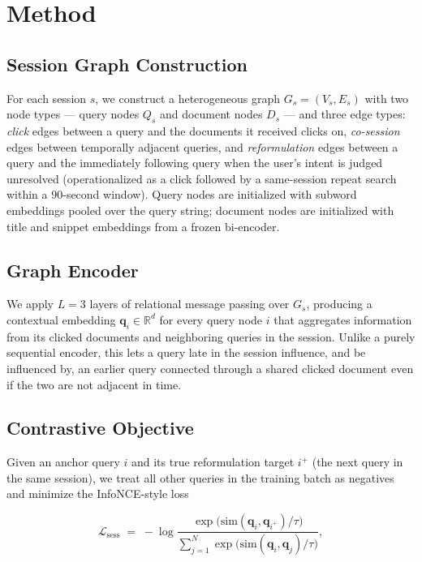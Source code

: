 \section{Method}
\label{sec:method}

\subsection{Session Graph Construction}

For each session $s$, we construct a heterogeneous graph $G_s = (V_s, E_s)$ with two
node types --- query nodes $Q_s$ and document nodes $D_s$ --- and three edge types:
\emph{click} edges between a query and the documents it received clicks on,
\emph{co-session} edges between temporally adjacent queries, and \emph{reformulation}
edges between a query and the immediately following query when the user's intent is
judged unresolved (operationalized as a click followed by a same-session repeat
search within a 90-second window). Query nodes are initialized with subword
embeddings pooled over the query string; document nodes are initialized with title
and snippet embeddings from a frozen bi-encoder.

\subsection{Graph Encoder}

We apply $L{=}3$ layers of relational message passing over $G_s$, producing a
contextual embedding $\mathbf{q}_i \in \mathbb{R}^d$ for every query node $i$ that
aggregates information from its clicked documents and neighboring queries in the
session. Unlike a purely sequential encoder, this lets a query late in the session
influence, and be influenced by, an earlier query connected through a shared clicked
document even if the two are not adjacent in time.

\subsection{Contrastive Objective}

Given an anchor query $i$ and its true reformulation target $i^+$ (the next query in
the same session), we treat all other queries in the training batch as negatives and
minimize the InfoNCE-style loss

\begin{equation}
\mathcal{L}_{\mathrm{sess}} \;=\; -\log
\frac{\exp\!\big(\mathrm{sim}(\mathbf{q}_i, \mathbf{q}_{i^+}) / \tau\big)}
     {\displaystyle\sum_{j=1}^{N} \exp\!\big(\mathrm{sim}(\mathbf{q}_i, \mathbf{q}_j) / \tau\big)},
\label{eq:contrastive}
\end{equation}

